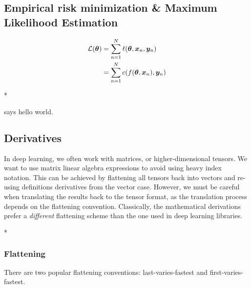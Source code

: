 \subsection{Empirical risk minimization \& Maximum Likelihood Estimation}

\begin{paracol}{2}

  \begin{align}
    {\mathcal{L}}({\bm{\theta}}) &= \sum_{n=1}^N \ell({\bm{\theta}}, {\bm{x}}_n, {\bm{y}}_n)
    \\
                 &=
                   \sum_{n=1}^N c(f({\bm{\theta}}, {\bm{x}}_n), {\bm{y}}_n)
  \end{align}

  \switchcolumn[0]

  \blindtext

  \switchcolumn[1]

  \switchcolumn[0]* %

  \blindtext

  \switchcolumn[1]


  \switchcolumn[0]

   says hello world.

  \subsection{Derivatives}

  \begin{caveat}
    In deep learning, we often work with matrices, or higher-dimensional tensors.
    We want to use matrix linear algebra expressions to avoid using heavy index notation.
    This can be achieved by flattening all tensors back into vectors and re-using definitions derivatives from the vector case.
    However, we must be careful when translating the results back to the tensor format, as the translation process depends on the flattening convention.
    Classically, the mathematical derivations prefer a \emph{different} flattening scheme than the one used in deep learning libraries.
  \end{caveat}

  \switchcolumn[0]*
  \subsubsection{Flattening}

  There are two popular flattening conventions: last-varies-fastest and first-varies-fastest.


\end{paracol}
